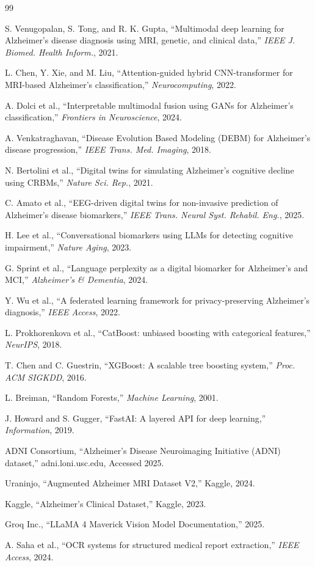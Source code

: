 \documentclass[conference]{IEEEtran}
\begin{document}
\begin{thebibliography}{99}

S. Venugopalan, S. Tong, and R. K. Gupta, ``Multimodal deep learning for Alzheimer's disease diagnosis using MRI, genetic, and clinical data,'' \textit{IEEE J. Biomed. Health Inform.}, 2021.

L. Chen, Y. Xie, and M. Liu, ``Attention-guided hybrid CNN-transformer for MRI-based Alzheimer's classification,'' \textit{Neurocomputing}, 2022.

A. Dolci et al., ``Interpretable multimodal fusion using GANs for Alzheimer's classification,'' \textit{Frontiers in Neuroscience}, 2024.

A. Venkatraghavan, ``Disease Evolution Based Modeling (DEBM) for Alzheimer's disease progression,'' \textit{IEEE Trans. Med. Imaging}, 2018.

N. Bertolini et al., ``Digital twins for simulating Alzheimer's cognitive decline using CRBMs,'' \textit{Nature Sci. Rep.}, 2021.

C. Amato et al., ``EEG-driven digital twins for non-invasive prediction of Alzheimer's disease biomarkers,'' \textit{IEEE Trans. Neural Syst. Rehabil. Eng.}, 2025.

H. Lee et al., ``Conversational biomarkers using LLMs for detecting cognitive impairment,'' \textit{Nature Aging}, 2023.

G. Sprint et al., ``Language perplexity as a digital biomarker for Alzheimer's and MCI,'' \textit{Alzheimer's \& Dementia}, 2024.

Y. Wu et al., ``A federated learning framework for privacy-preserving Alzheimer's diagnosis,'' \textit{IEEE Access}, 2022.

L. Prokhorenkova et al., ``CatBoost: unbiased boosting with categorical features,'' \textit{NeurIPS}, 2018.

T. Chen and C. Guestrin, ``XGBoost: A scalable tree boosting system,'' \textit{Proc. ACM SIGKDD}, 2016.

L. Breiman, ``Random Forests,'' \textit{Machine Learning}, 2001.

J. Howard and S. Gugger, ``FastAI: A layered API for deep learning,'' \textit{Information}, 2019.

ADNI Consortium, ``Alzheimer's Disease Neuroimaging Initiative (ADNI) dataset,'' adni.loni.usc.edu, Accessed 2025.

Uraninjo, ``Augmented Alzheimer MRI Dataset V2,'' Kaggle, 2024.

Kaggle, ``Alzheimer's Clinical Dataset,'' Kaggle, 2023.

Groq Inc., ``LLaMA 4 Maverick Vision Model Documentation,'' 2025.

A. Saha et al., ``OCR systems for structured medical report extraction,'' \textit{IEEE Access}, 2024.

\end{thebibliography}
\end{document}
